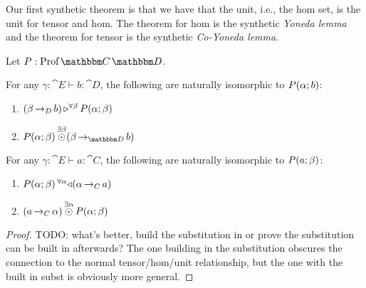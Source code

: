 \documentclass{llncs}
\begin{document}
Our first synthetic theorem is that we have that the unit, i.e., the
hom set, is the unit for tensor and hom.
%
The theorem for hom is the synthetic \emph{Yoneda lemma} and the
theorem for tensor is the synthetic \emph{Co-Yoneda lemma}.
\begin{lemma}
  \label{lem:yo-and-co-yo}
  Let $P : \harr {\cat C} {\cat D}$.

  For any $\gamma : \cat E \vdash b : \cat D$, the following are naturally isomorphic to $\harrapp P \alpha b$:
  \begin{enumerate}
  \item $\homrallXYtoZ {\beta} {(\punitinXfromYtoZ {D} {\beta} {b})} {\harrapp P {\alpha} {\beta}}$
  \item $\tensorexistsXwithYandZ {\beta} {\harrapp P \alpha {\beta}} {(\punitinXfromYtoZ {\cat D} {\beta} {b})}$
  \end{enumerate}

  For any $\gamma : \cat E \vdash a : \cat C$, the following are naturally isomorphic to $\harrapp P a \beta$:
  \begin{enumerate}
  \item $\homlallXYtoZ {{\alpha}} {(\punitinXfromYtoZ {C} {\alpha} {a})} {\harrapp P {{\alpha}} {\beta}}$
  \item $\tensorexistsXwithYandZ {\alpha} {(\punitinXfromYtoZ {C} {a} {\alpha})} {\harrapp P {\alpha}{\beta}}$
  \end{enumerate}
\end{lemma}
\begin{proof}
  TODO: what's better, build the substitution in or prove the
  substitution can be built in afterwards? The one building in the
  substitution obscures the connection to the normal tensor/hom/unit
  relationship, but the one with the built in subst is obviously more
  general.
\end{proof}
\end{document}
